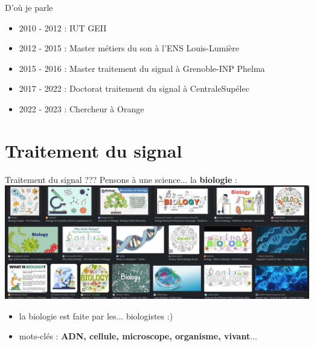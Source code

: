 \documentclass[9pt, aspectratio=169]{beamer}
\begin{document}
\begin{frame}{D'où je parle} %
\begin{center}

    \begin{itemize}
        \item 2010 - 2012 : IUT GEII
        \item 2012 - 2015 : Master métiers du son à l'ENS Louis-Lumière
        \item 2015 - 2016 : Master traitement du signal à Grenoble-INP Phelma
        \item 2017 - 2022 : Doctorat traitement du signal à CentraleSupélec
        \item 2022 - 2023 : Chercheur à Orange
    \end{itemize}
\end{center}
\end{frame}


\section{Traitement du signal}

\begin{frame}{} %
\begin{center}
\Huge \insertsection
\end{center}
\end{frame}

\begin{frame}{\og Traitement du signal \fg{} ???} %
Pensons à une science... \pause la \textbf{biologie} :
\pause
\includegraphics[width=\textwidth]{fig/search_results_biology.jpg}
\pause
\begin{itemize}
    \item la biologie est faite par les... biologistes :)
    \item mots-clés : \textbf{ADN, cellule, microscope, organisme, vivant}...
\end{itemize}

\end{frame}
\end{document}
